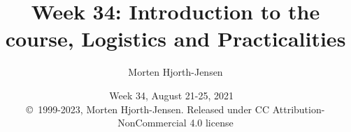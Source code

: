 \documentclass{beamer}
\begin{document}

\newcommand{\exercisesection}[1]{\subsection*{#1}}







\title{Week 34: Introduction to the course, Logistics and Practicalities}


\author{Morten Hjorth-Jensen}

\date{Week 34, August 21-25, 2021
\ \\ 
{\tiny \copyright\ 1999-2023, Morten Hjorth-Jensen. Released under CC Attribution-NonCommercial 4.0 license}
}

\begin{frame}
\titlepage
\end{frame}
\end{document}
